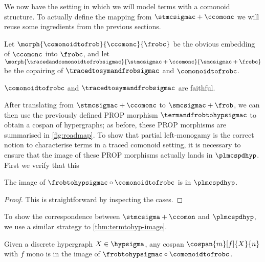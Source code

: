 We now have the setting in which we will model terms with a comonoid structure.
To actually define the mapping from \(\stmcsigmac + \ccomonc\) we will reuse
some ingredients from the previous sections.

\begin{definition}
    Let \(
        \morph{
            \comonoidtofrob
        }{
            \ccomonc
        }{
            \frobc
        }
    \) be the obvious embedding of \(\ccomonc\) into \(\frobc\), and let \(
        \morph{
            \tracedandcomonoidtofrobsigmac
        }{
            \stmcsigmac + \ccomonc
        }{
            \smcsigmac + \frobc
        }
    \) be the copairing of \(\tracedtosymandfrobsigmac\) and
    \(\comonoidtofrobc\).
\end{definition}

\begin{corollary}
    \(\comonoidtofrobc\) and \(\tracedtosymandfrobsigmac\) are faithful.
\end{corollary}

After translating from \(\stmcsigmac + \ccomonc\) to \(\smcsigmac + \frob\),
we can then use the previously defined PROP morphism \(\termandfrobtohypsigmac\)
to obtain a cospan of hypergraphs; as before, these PROP morphisms are
summarised in \cref{fig:roadmap}.
To show that partial left-monogamy is the correct notion to characterise terms
in a traced comonoid setting, it is necessary to ensure that the image of these
PROP morphisms actually lands in \(\plmcspdhyp\).
First we verify that this

\begin{lemma}
    The image of \(\frobtohypsigmac \circ \comonoidtofrobc\) is in
    \(\plmcspdhyp\).
\end{lemma}
\begin{proof}
    This is straightforward by inspecting the cases.
\end{proof}

To show the correspondence between \(\stmcsigma + \ccomon\) and
\(\plmcspdhyp\), we use a similar strategy to \cref{thm:termtohyp-image}.

\begin{lemma}\label{lem:discrete-mono}
    Given a discrete hypergraph \(X \in \hypsigma\), any cospan
    \(\cospan{m}[f]{X}{n}\) with \(f\) mono is in the image of
    \(\frobtohypsigmac \circ \comonoidtofrobc\).
\end{lemma}


